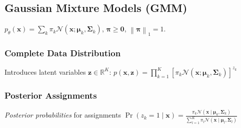 \documentclass[11pt,a4paper,technote]{IEEEtran}
\newcommand{\norm}[1]{\left\lVert#1\right\rVert}
\newcommand{\matr}[1]{\boldsymbol{\mathbf{#1}}}
\newcommand{\vect}[1]{\boldsymbol{\mathbf{#1}}}
\newcommand{\normal}{\mathcal{N}}
\newcommand{\R}{\mathbb{R}}
\begin{document}
\vspace{-1em}
\subsection*{Gaussian Mixture Models (GMM)}
$p_{\theta}(\vect{x}) = \sum_{k} \pi_k \normal(\vect{x}; \vect{\mu}_k,
\matr{\Sigma}_k)$, $\vect{\pi}\geq\vect{0}$, $\norm{\vect{\pi}}_1 = 1$.

\subsubsection*{Complete Data Distribution}
Introduces latent variables $\vect{z}\in\R^K$:
$p(\vect{x}, \vect{z}) = \prod_{k=1}^K {\left[ \pi_k \normal(\vect{x};
    \vect{\mu}_k, \matr{\Sigma}_k)\right]}^{z_k}$

\subsubsection*{Posterior Assignments}
\emph{Posterior probabilities} for assignments
\(
  \Pr(z_k = 1 \mid \vect{x}) = \frac{\pi_k \normal(\vect{x} \mid \vect{\mu}_k,
    \matr{\Sigma}_k)}{\sum_{l=1}^K \pi_l \normal(\vect{x} \mid \vect{\mu}_l,
    \matr{\Sigma}_l)}
\)
\end{document}
